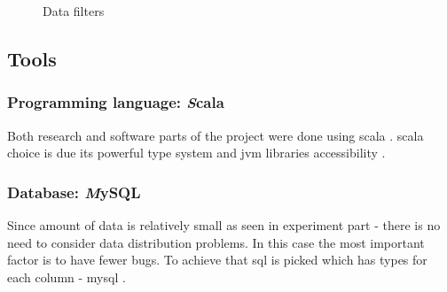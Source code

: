 \documentclass[a4paper,12pt]{article}
\begin{document}
	\begin{figure}[!tbp]
		\centering
		\hfill
		\hfill
		\caption{Data filters}
	\end{figure}
	
	\clearpage
	
	\subsection{Tools}
	\subsubsection{Programming language: {\textit Scala}}
	
	Both research and software parts of the project were done using \gls{scala} \cite{scala_lang}. \Gls{scala} choice is due its powerful type system and \gls{jvm} libraries accessibility \cite{scala_in_depth}. 
	
	\subsubsection{Database: {\textit MySQL}}
	
	Since amount of data is relatively small as seen in experiment part - there is no need to consider data distribution problems. In this case the most important factor is to have fewer bugs. To achieve that \acrfull{sql} is picked which has types for each column - \gls{mysql} \cite{mysql_lang}.
	
\end{document}

